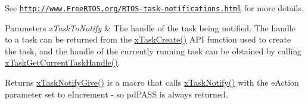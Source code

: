 See \href{http://www.FreeRTOS.org/RTOS-task-notifications.html}{\tt http\+://www.\+Free\+R\+T\+O\+S.\+org/\+R\+T\+O\+S-\/task-\/notifications.\+html} for more details.


\begin{DoxyParams}{Parameters}
{\em x\+Task\+To\+Notify} & The handle of the task being notified. The handle to a task can be returned from the \hyperlink{vendor_2ceedling_2plugins_2freertos_2src_2freertos_2include_2task_8h_adf67e7cd0bfd1eda9e8afd048206f7c2}{x\+Task\+Create()} A\+PI function used to create the task, and the handle of the currently running task can be obtained by calling \hyperlink{externals_2freertos_2include_2task_8h_a85a0f9c9f817b18686efbf8f37c72dfc}{x\+Task\+Get\+Current\+Task\+Handle()}.\\
\hline
\end{DoxyParams}
\begin{DoxyReturn}{Returns}
\hyperlink{vendor_2ceedling_2plugins_2freertos_2src_2freertos_2include_2task_8h_ac60cbd05577a3e4f3c3587dd9b213930}{x\+Task\+Notify\+Give()} is a macro that calls \hyperlink{vendor_2ceedling_2plugins_2freertos_2src_2freertos_2include_2task_8h_a0d2d54fb8a64011dfbb54983e4ed06bd}{x\+Task\+Notify()} with the e\+Action parameter set to e\+Increment -\/ so pd\+P\+A\+SS is always returned. 
\end{DoxyReturn}
